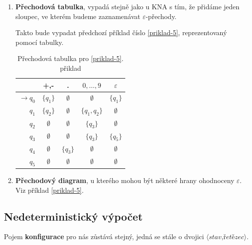 \documentclass[10pt, a4paper, titlepage]{article}
\theoremstyle{note}
\begin{document}
\begin{enumerate}

\item
\textbf{Přechodová tabulka}, vypadá stejně jako u KNA s tím, že přidáme jeden sloupec, ve kterém budeme zaznamenávat $\varepsilon$-přechody.

Takto bude vypadat předchozí př\'iklad číslo \ref{priklad-5}, reprezentovaný pomocí tabulky.

\begin{table}[h]
\begin{center}
\begin{tabular}{ r || c | c | c | c }                   
   & +,- & . & $0,\ldots,9$ & $\varepsilon$ \\
   \hline
   $ \rightarrow q_{0} $ & $ \lbrace q_{1} \rbrace $ & $ \emptyset $ & $ \emptyset $ & $ \lbrace q_{1} \rbrace $\\
   $ q_{1} $ & $ \lbrace q_{2} \rbrace $ & $ \emptyset $ & $ \lbrace q_{1},q_{2} \rbrace $ & $\emptyset$ \\
   $ q_{2} $ & $ \emptyset $ & $ \emptyset $ & $\lbrace q_{3} \rbrace$ & $ \emptyset $ \\
   $ q_{3} $ & $ \emptyset $ & $ \emptyset $ & $\lbrace q_{3} \rbrace$ & $\lbrace q_{5} \rbrace$ \\
   $ q_{4} $ & $ \emptyset $ & $\lbrace q_{3} \rbrace$ & $\emptyset$ & $ \emptyset $ \\
   $ q_{5} $ & $ \emptyset $ &  $ \emptyset $ & $\emptyset$ & $ \emptyset $ 
\end{tabular}
\end{center}
\caption{Přechodov\'a tabulka pro \ref{priklad-5}. přiklad}
\end{table}

\item
\textbf{Přechodový diagram}, u kterého mohou být některé hrany ohodnoceny $\varepsilon$. Viz příklad \ref{priklad-5}.

\end{enumerate}

\subsection{Nedeterministický výpočet}
Pojem \textbf{konfigurace} pro nás zůstává stejný, jedná se stále o dvojici $\langle \textit{stav,řetězec} \rangle$.
\end{document}
